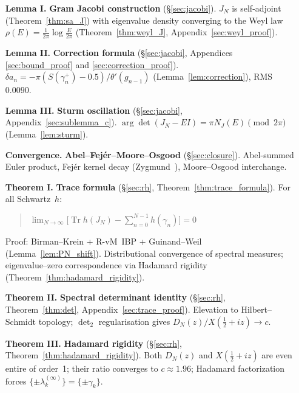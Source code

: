 \documentclass{pre-aomart}
\def\xi{X}%
\theoremstyle{plain}
\theoremstyle{definition}
\theoremstyle{remark}
\begin{document}
\begin{enumerate}[itemsep=2pt,leftmargin=*,labelsep=0.5em]
\item[\textbf{Lemma I.}]
\textbf{Gram Jacobi construction} (\S\ref{sec:jacobi}).
$J_N$ is self-adjoint (Theorem~\ref{thm:sa_J}) with eigenvalue
density converging to the Weyl law $\rho(E)=\frac{1}{2\pi}\log\frac{E}{2\pi}$
(Theorem~\ref{thm:weyl_J}, Appendix~\ref{sec:weyl_proof}).

\item[\textbf{Lemma II.}]
\textbf{Correction formula} (\S\ref{sec:jacobi}, Appendices \ref{sec:bound_proof} and \ref{sec:correction_proof}).
$\delta a_n = -\pi (S(\gamma_n^+)-0.5)/\theta'(g_{n-1})$
(Lemma~\ref{lem:correction}), RMS $0.0090$.

\item[\textbf{Lemma III.}]
\textbf{Sturm oscillation} (\S\ref{sec:jacobi}, Appendix~\ref{sec:sublemma_c}).
$\arg\det(J_N - EI) = \pi N_J(E) \pmod{2\pi}$ (Lemma~\ref{lem:sturm}).

\item[\textbf{Convergence.}]
\textbf{Abel--Fej\'er--Moore--Osgood} (\S\ref{sec:closure}).
Abel-summed Euler product, Fej\'er kernel decay (Zygmund~\cite{Zygmund1959}),
Moore--Osgood interchange.

\item[\textbf{Theorem I.}]
\textbf{Trace formula}
(\S\ref{sec:rh}, Theorem~\ref{thm:trace_formula}).
For all Schwartz~$h$:
\begin{quote}\small
$\displaystyle\lim_{N\to\infty}\bigl[\operatorname{Tr} h(J_N)
  - \sum_{n=0}^{N-1} h(\gamma_n)\bigr] = 0$
\end{quote}
\noindent Proof: Birman--Krein + R-vM~IBP
+ Guinand--Weil (Lemma~\ref{lem:PN_shift}).
Distributional convergence of spectral measures;
eigenvalue--zero correspondence via
Hadamard rigidity (Theorem~\ref{thm:hadamard_rigidity}).

\item[\textbf{Theorem II.}]
\textbf{Spectral determinant identity} (\S\ref{sec:rh}, Theorem~\ref{thm:det}, Appendix~\ref{sec:trace_proof}).
Elevation to Hilbert--Schmidt topology; $\det_2$ regularisation gives
$D_N(z)/\xi(\tfrac12+iz) \to c$.

\item[\textbf{Theorem III.}]
\textbf{Hadamard rigidity}
(\S\ref{sec:rh}, Theorem~\ref{thm:hadamard_rigidity}).
Both $D_N(z)$ and $\xi(\tfrac12+iz)$ are even entire of order~1;
their ratio converges to $c \approx 1.96$; Hadamard factorization
forces $\{\pm\lambda_k^{(\infty)}\} = \{\pm\gamma_k\}$.


\end{enumerate}
\end{document}

